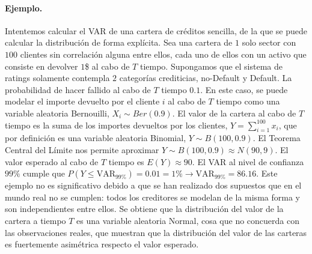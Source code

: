 \paragraph{Ejemplo.} Intentemos calcular el VAR de una cartera de cr\'editos
sencilla, de la que se puede calcular la distribuci\'on de forma expl\'icita. 
Sea una cartera de $1$ solo sector con $100$ clientes sin correlaci\'on alguna
entre ellos, cada uno de ellos con un activo que consiste en devolver $1$\$ al 
cabo de $T$ tiempo. Supongamos que el sistema de ratings solamente contempla 
$2$ categor\'ias crediticias, no-Default y Default. La probabilidad de hacer 
fallido al cabo de $T$ tiempo $0.1$.
\newline
\newline
En este caso, se puede modelar el importe devuelto por el cliente $i$ al cabo 
de $T$ tiempo como una variable aleatoria Bernouilli, $X_i \sim Ber(0.9)$. El 
valor de la cartera al cabo de $T$ tiempo es la suma de los importes devueltos 
por los clientes, $Y = \sum_{i=1}^{100} x_i$, que por definici\'on es una 
variable aleatoria Binomial, $Y \sim B(100,0.9)$. El Teorema Central del 
L\'imite nos permite aproximar $Y \sim B(100,0.9) \approx N(90, 9)$.
\newline
\newline
El valor esperado al cabo de $T$ tiempo es $E(Y) \approx 90$. El VAR al nivel 
de confianza $99\%$ cumple que $P(Y \leq \textrm{VAR}_{99\%}) = 0.01 = 1\% 
\longrightarrow \textrm{VAR}_{99\%}=86.16$.
\newline
\newline
Este ejemplo no es significativo debido a que se han realizado dos supuestos 
que en el mundo real no se cumplen: todos los creditores se modelan de la misma 
forma y son independientes entre ellos. Se obtiene que la distribuci\'on del 
valor de la cartera a tiempo $T$ es una variable aleatoria Normal, cosa que no
concuerda con las observaciones reales, que muestran que la distribuci\'on del 
valor de las carteras es fuertemente asim\'etrica respecto el valor esperado.

